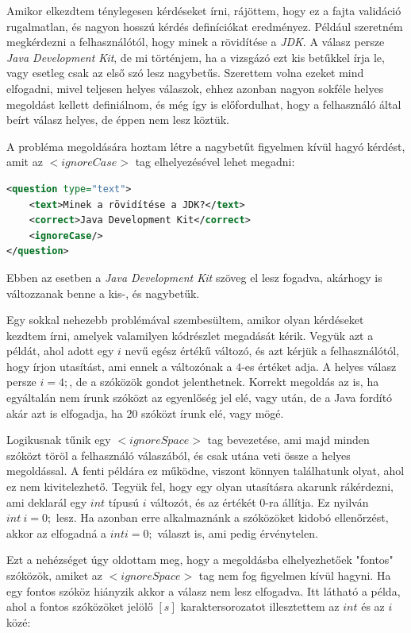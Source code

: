 \documentclass[12pt,a4paper]{article}
\begin{document}
	Amikor elkezdtem ténylegesen kérdéseket írni, rájöttem, hogy ez a fajta validáció rugalmatlan, és nagyon hosszú kérdés definíciókat eredményez. Például szeretném megkérdezni a felhasználótól, hogy minek a rövidítése a \textit{JDK}. A válasz persze \textit{Java Development Kit}, de mi történjem, ha a vizsgázó ezt kis betűkkel írja le, vagy esetleg csak az első szó lesz nagybetűs. Szerettem volna ezeket mind elfogadni, mivel teljesen helyes válaszok, ehhez azonban nagyon sokféle helyes megoldást kellett definiálnom, és még így is előfordulhat, hogy a felhasználó által beírt válasz helyes, de éppen nem lesz köztük.
	
	A probléma megoldására hoztam létre a nagybetűt figyelmen kívül hagyó kérdést, amit az $<ignoreCase>$ tag elhelyezésével lehet megadni:
	
	\begin{lstlisting}[language=XML]	
<question type="text">
	<text>Minek a rövidítése a JDK?</text>
	<correct>Java Development Kit</correct>
	<ignoreCase/>
</question>
	\end{lstlisting}
	
	\noindent
	Ebben az esetben a \textit{Java Development Kit} szöveg el lesz fogadva, akárhogy is változzanak benne a kis-, és nagybetűk.
	
	Egy sokkal nehezebb problémával szembesültem, amikor olyan kérdéseket kezdtem írni, amelyek valamilyen kódrészlet megadását kérik. Vegyük azt a példát, ahol adott egy $i$ nevű egész értékű változó, és azt kérjük a felhasználótól, hogy írjon utasítást, ami ennek a változónak a $4$-es értéket adja. A helyes válasz persze $i = 4;$, de a szóközök gondot jelenthetnek. Korrekt megoldás az is, ha egyáltalán nem írunk szóközt az egyenlőség jel elé, vagy után, de a Java fordító akár azt is elfogadja, ha 20 szóközt írunk elé, vagy mögé.
	
	Logikusnak tűnik egy $<ignoreSpace>$ tag bevezetése, ami majd minden szóközt töröl a felhasználó válaszából, és csak utána veti össze a helyes megoldással. A fenti példára ez működne, viszont könnyen találhatunk olyat, ahol ez nem kivitelezhető. Tegyük fel, hogy egy olyan utasításra akarunk rákérdezni, ami deklarál egy $int$ típusú $i$ változót, és az értékét $0$-ra állítja. Ez nyilván $int \ i = 0;$ lesz. Ha azonban erre alkalmaznánk a szóközöket kidobó ellenőrzést, akkor az elfogadná a $inti=0;$ választ is, ami pedig érvénytelen.
	
	Ezt a nehézséget úgy oldottam meg, hogy a megoldásba elhelyezhetőek "fontos" szóközök, amiket az $<ignoreSpace>$ tag nem fog figyelmen kívül hagyni. Ha egy fontos szóköz hiányzik akkor a válasz nem lesz elfogadva. Itt látható a példa, ahol a fontos szóközöket jelölő $[s]$ karaktersorozatot illesztettem az $int$ és az $i$ közé:
	
\end{document}
